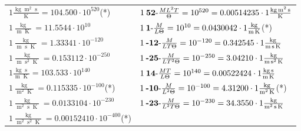 \begin{center}
\begin{longtable}{l l}
{\color{black}$1 \bm{\mathrm{ }}\frac{\operatorname{kg}\operatorname{m}^2\operatorname{s}}{\operatorname{K}} = 104.500\cdot10^{520} $}\quad(*)&
	{\color{black}$1\:\text{\textbf{52}-} \frac{ML^2T}{\Theta}=10^{520} = 0.00514235 \cdot 1 \bm{\mathrm{ }}\frac{\operatorname{kg}\operatorname{m}^2\operatorname{s}}{\operatorname{K}}$}\\
{\color{black}$1 \bm{\mathrm{ }}\frac{\operatorname{kg}}{\operatorname{m}\operatorname{K}} = 11.5544\cdot10^{10} $}&
	{\color{black}$1\:\text{\textbf{1}-} \frac{M}{L\Theta}=10^{10} = 0.0430042 \cdot 1 \bm{\mathrm{ }}\frac{\operatorname{kg}}{\operatorname{m}\operatorname{K}}$}\quad(*)\\
{\color{black}$1 \bm{\mathrm{ }}\frac{\operatorname{kg}}{\operatorname{m}\operatorname{s}\operatorname{K}} = 1.33341\cdot10^{-120} $}&
	{\color{black}$1\:\text{\textbf{-12}-} \frac{M}{LT\Theta}=10^{-120} = 0.342545 \cdot 1 \bm{\mathrm{ }}\frac{\operatorname{kg}}{\operatorname{m}\operatorname{s}\operatorname{K}}$}\\
{\color{black}$1 \bm{\mathrm{ }}\frac{\operatorname{kg}}{\operatorname{m}\operatorname{s}^2\operatorname{K}} = 0.153112\cdot10^{-250} $}&
	{\color{black}$1\:\text{\textbf{-25}-} \frac{M}{LT^2\Theta}=10^{-250} = 3.04210 \cdot 1 \bm{\mathrm{ }}\frac{\operatorname{kg}}{\operatorname{m}\operatorname{s}^2\operatorname{K}}$}\\
{\color{black}$1 \bm{\mathrm{ }}\frac{\operatorname{kg}\operatorname{s}}{\operatorname{m}\operatorname{K}} = 103.533\cdot10^{140} $}&
	{\color{black}$1\:\text{\textbf{14}-} \frac{MT}{L\Theta}=10^{140} = 0.00522424 \cdot 1 \bm{\mathrm{ }}\frac{\operatorname{kg}\operatorname{s}}{\operatorname{m}\operatorname{K}}$}\\
{\color{black}$1 \bm{\mathrm{ }}\frac{\operatorname{kg}}{\operatorname{m}^2\operatorname{K}} = 0.115335\cdot10^{-100} $}\quad(*)&
	{\color{black}$1\:\text{\textbf{-10}-} \frac{M}{L^2\Theta}=10^{-100} = 4.31200 \cdot 1 \bm{\mathrm{ }}\frac{\operatorname{kg}}{\operatorname{m}^2\operatorname{K}}$}\quad(*)\\
{\color{black}$1 \bm{\mathrm{ }}\frac{\operatorname{kg}}{\operatorname{m}^2\operatorname{s}\operatorname{K}} = 0.0133104\cdot10^{-230} $}&
	{\color{black}$1\:\text{\textbf{-23}-} \frac{M}{L^2T\Theta}=10^{-230} = 34.3550 \cdot 1 \bm{\mathrm{ }}\frac{\operatorname{kg}}{\operatorname{m}^2\operatorname{s}\operatorname{K}}$}\\
{\color{black}$1 \bm{\mathrm{ }}\frac{\operatorname{kg}}{\operatorname{m}^2\operatorname{s}^2\operatorname{K}} = 0.00152410\cdot10^{-400} $}\quad(*)&

\end{longtable}
\end{center}
